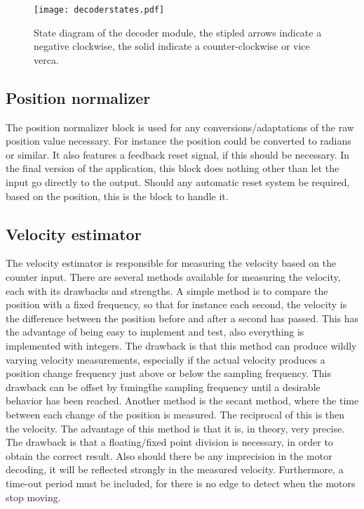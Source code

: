 \begin{figure}[htb]
\centering
\texttt{[image: decoderstates.pdf]}
\caption{State diagram of the decoder module, the stipled arrows indicate a negative clockwise, the solid indicate a counter-clockwise or vice verca.}
\label{fig:decoderstate}
\end{figure}

\subsection{Position normalizer}
The position normalizer block is used for any conversions/adaptations of the raw position value necessary. For instance the position could be converted to radians or similar. It also features a feedback reset signal, if this should be necessary. 
In the final version of the application, this block does nothing other than let the input go directly to the output.
Should any automatic reset system be required, based on the position, this is the block to handle it.

\subsection{Velocity estimator}
The velocity estimator is responsible for measuring the velocity based on the counter input.
There are several methods available for measuring the velocity, each with its drawbacks and strengths.
A simple method is to compare the position with a fixed frequency, so that for instance each second, the velocity is the difference between the position before and after a second has passed. This has the advantage of being easy to implement and test, also everything is implemented with integers. The drawback is that this method can produce wildly varying velocity measurements, especially if the actual velocity produces a position change frequency just above or below the sampling frequency.
This drawback can be offset by \"tuning\" the sampling frequency until a desirable behavior has been reached.
Another method is the secant method, where the time between each change of the position is measured. The reciprocal of this is then the velocity. The advantage of this method is that it is, in theory, very precise. The drawback is that a floating/fixed point division is necessary, in order to obtain the correct result. Also should there be any imprecision in the motor decoding, it will be reflected strongly in the measured velocity. Furthermore, a time-out period must be included, for there is no edge to detect when the motors stop moving.

